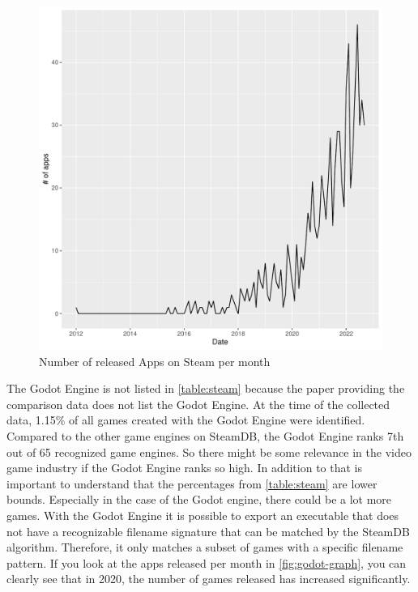 \begin{figure}[h!]
    \begin{center}
        \includegraphics[width=1\columnwidth]{figures/godot-graph.pdf}
        \caption{\label{fig:godot-graph} Number of released Apps on Steam per month}
    \end{center}
\end{figure}

The Godot Engine is not listed in \autoref{table:steam} because the paper providing the comparison data does not list the Godot Engine.
At the time of the collected data, 1.15\% of all games created with the Godot Engine were identified.
Compared to the other game engines on SteamDB, the Godot Engine ranks 7th out of 65 recognized game engines.
So there might be some relevance in the video game industry if the Godot Engine ranks so high.
In addition to that is important to understand that the percentages from \autoref{table:steam} are lower bounds.
Especially in the case of the Godot engine, there could be a lot more games.
With the Godot Engine it is possible to export an executable that does not have a recognizable filename signature that can be matched by the SteamDB algorithm.
Therefore, it only matches a subset of games with a specific filename pattern.
If you look at the apps released per month in \autoref{fig:godot-graph}, you can clearly see that in 2020, the number of games released has increased significantly.\\

